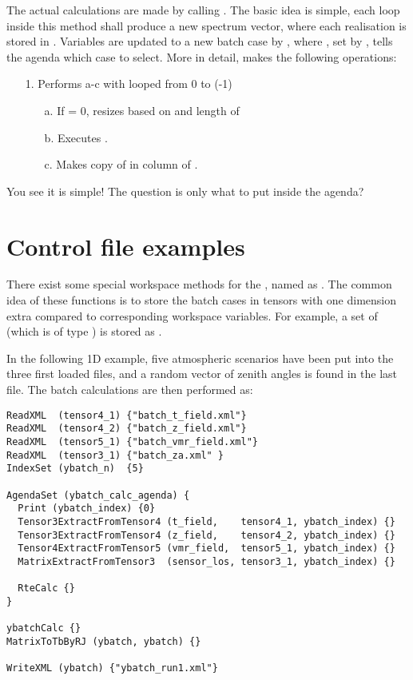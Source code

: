 The actual calculations are made by calling . The
basic idea is simple, each loop inside this method shall produce a new
spectrum vector, where each realisation is stored in
. Variables are updated to a new batch case by
, where , set
by , tells the agenda which case to select.
More in detail,  makes the following operations:

\begin{itemize}

\item[1.] Performs a-c with  looped from 0
to (-1)

\begin{itemize}
\item[a.] If  = 0, resizes
 based
on  and length of  
\item[b.] Executes .
\item[c.] Makes copy of  in column  of .
\end{itemize}

\end{itemize}

You see it is simple! The question is only what to put inside the
agenda?


\section{Control file examples}
%
There exist some special workspace methods for the
, named as
.  The common idea of these functions is to
store the batch cases in tensors with one dimension extra compared to
corresponding workspace variables. For example, a set of
 (which is of type ) is stored
as .

In the following 1D example, five atmospheric scenarios
have been put into the three first loaded files, and a random vector
of zenith angles is found in the last file. The batch calculations
are then performed as:

\begin{verbatim}
ReadXML  (tensor4_1) {"batch_t_field.xml"}
ReadXML  (tensor4_2) {"batch_z_field.xml"}
ReadXML  (tensor5_1) {"batch_vmr_field.xml"}
ReadXML  (tensor3_1) {"batch_za.xml" }
IndexSet (ybatch_n)  {5}

AgendaSet (ybatch_calc_agenda) {
  Print (ybatch_index) {0}
  Tensor3ExtractFromTensor4 (t_field,    tensor4_1, ybatch_index) {}
  Tensor3ExtractFromTensor4 (z_field,    tensor4_2, ybatch_index) {}
  Tensor4ExtractFromTensor5 (vmr_field,  tensor5_1, ybatch_index) {}
  MatrixExtractFromTensor3  (sensor_los, tensor3_1, ybatch_index) {}

  RteCalc {}
}

ybatchCalc {}
MatrixToTbByRJ (ybatch, ybatch) {}

WriteXML (ybatch) {"ybatch_run1.xml"}
\end{verbatim}

